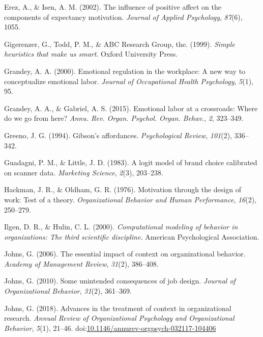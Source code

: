 \documentclass[english,,man]{apa6}
\theoremstyle{definition}
\theoremstyle{definition}
\theoremstyle{definition}
\theoremstyle{remark}
\begin{document}
\leavevmode\hypertarget{ref-erez2002}{}%
Erez, A., \& Isen, A. M. (2002). The influence of positive affect on the
components of expectancy motivation. \emph{Journal of Applied
Psychology}, \emph{87}(6), 1055.

\leavevmode\hypertarget{ref-gigerenzer1999}{}%
Gigerenzer, G., Todd, P. M., \& ABC Research Group, the. (1999).
\emph{Simple heuristics that make us smart}. Oxford University Press.

\leavevmode\hypertarget{ref-grandey2000}{}%
Grandey, A. A. (2000). Emotional regulation in the workplace: A new way
to conceptualize emotional labor. \emph{Journal of Occupational Health
Psychology}, \emph{5}(1), 95.

\leavevmode\hypertarget{ref-grandey2015}{}%
Grandey, A. A., \& Gabriel, A. S. (2015). Emotional labor at a
crossroads: Where do we go from here? \emph{Annu. Rev. Organ. Psychol.
Organ. Behav.}, \emph{2}, 323--349.

\leavevmode\hypertarget{ref-greeno1994}{}%
Greeno, J. G. (1994). Gibson's affordances. \emph{Psychological Review},
\emph{101}(2), 336--342.

\leavevmode\hypertarget{ref-guadagni1983}{}%
Guadagni, P. M., \& Little, J. D. (1983). A logit model of brand choice
calibrated on scanner data. \emph{Marketing Science}, \emph{2}(3),
203--238.

\leavevmode\hypertarget{ref-hackman1976}{}%
Hackman, J. R., \& Oldham, G. R. (1976). Motivation through the design
of work: Test of a theory. \emph{Organizational Behavior and Human
Performance}, \emph{16}(2), 250--279.

\leavevmode\hypertarget{ref-Ilgen2000}{}%
Ilgen, D. R., \& Hulin, C. L. (2000). \emph{Computational modeling of
behavior in organizations: The third scientific discipline.} American
Psychological Association.

\leavevmode\hypertarget{ref-johns2006}{}%
Johns, G. (2006). The essential impact of context on organizational
behavior. \emph{Academy of Management Review}, \emph{31}(2), 386--408.

\leavevmode\hypertarget{ref-johns2010}{}%
Johns, G. (2010). Some unintended consequences of job design.
\emph{Journal of Organizational Behavior}, \emph{31}(2), 361--369.

\leavevmode\hypertarget{ref-johns2017}{}%
Johns, G. (2018). Advances in the treatment of context in organizational
research. \emph{Annual Review of Organizational Psychology and
Organizational Behavior}, \emph{5}(1), 21--46.
doi:\href{https://doi.org/10.1146/annurev-orgpsych-032117-104406}{10.1146/annurev-orgpsych-032117-104406}
\end{document}
